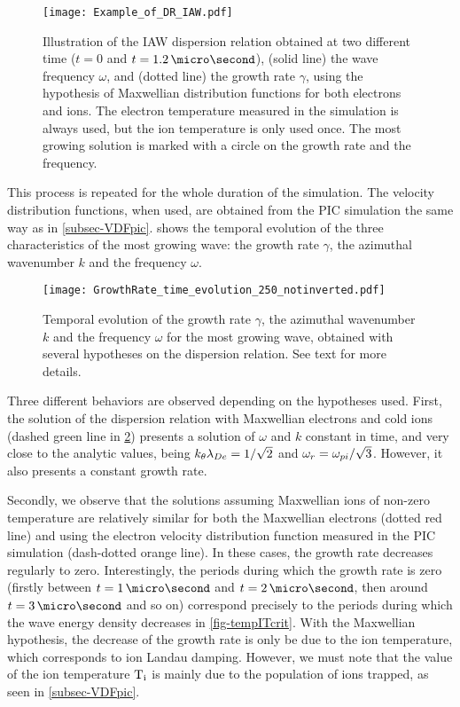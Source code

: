     \begin{figure}[hbt]
      \centering
      \texttt{[image: Example\_of\_DR\_IAW.pdf]}
      \caption{Illustration of the \acs{IAW} dispersion relation obtained at two different time ($t=0$ and $t=1.2\,\micro\second$), (solid line) the wave frequency $\omega$, and (dotted line) the growth rate $\gamma$, using the hypothesis of Maxwellian distribution functions for both electrons and ions. The electron temperature measured in the simulation is always used, but the ion temperature is only used once. The most growing solution is marked with a circle on the growth rate and the frequency.}
      \label{fig-Example_of_DR_IAW}
    \end{figure}
    
    
    This process is repeated for the whole duration of the simulation.
    The velocity distribution functions, when used, are obtained from the \ac{PIC} simulation the same way as in \cref{subsec-VDFpic}.
     shows the temporal evolution of the three characteristics of the most growing wave\string: the growth rate $\gamma$, the azimuthal wavenumber $k$ and the frequency $\omega$.
    \begin{figure}[hbt]
      \centering
      \texttt{[image: GrowthRate\_time\_evolution\_250\_notinverted.pdf]}  %
      \caption{Temporal evolution of the growth rate $\gamma$, the azimuthal wavenumber $k$ and the frequency $\omega$ for the most growing wave, obtained with several hypotheses on the dispersion relation. See text for more details. }
      \label{fig-time_wave}
    \end{figure}
    
    Three different behaviors are observed depending on the hypotheses used.
    First, the solution of the dispersion relation with Maxwellian electrons and cold ions (dashed green line in \cref{fig-time_wave}) presents a solution of $\omega$ and $k$ constant in time, and very close to the analytic values, being $k_{\theta}\lambda_{De} = 1/\sqrt{2}$ and $\omega_r = \omega_{pi}/\sqrt{3}$.
    However, it also presents a constant growth rate.
    
    Secondly, we observe that the solutions assuming Maxwellian ions of non-zero temperature are relatively similar for both the Maxwellian electrons  (dotted red line) and using the electron velocity distribution function measured in the \ac{PIC} simulation (dash-dotted orange line).
    In these cases, the growth rate decreases regularly to zero.
    Interestingly, the periods during which the growth rate is zero (firstly between $t=1\,\micro\second$ and $t=2\,\micro\second$, then around $t=3\,\micro\second$ and so on) correspond precisely to the periods during which the wave energy density decreases in \cref{fig-tempITcrit}.
    With the Maxwellian hypothesis, the decrease of the growth rate is only be due to the ion temperature, which corresponds to ion Landau damping.
    However, we must note that the value of the ion temperature $\mathrm{T_i}$ is mainly due to the population of ions trapped, as seen in \cref{subsec-VDFpic}.
    
